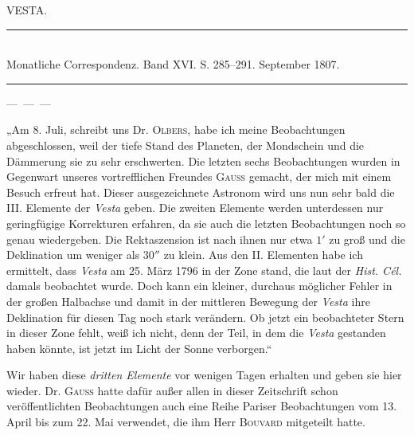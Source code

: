 \clearpage
{}
\hypertarget{native-295-lower}{}
\centerline{VESTA.}

\begin{center}
\rule{0.5\linewidth}{0.4pt}\\[2pt]
Monatliche Correspondenz. Band XVI. S. 285–291. September 1807.\\[2pt]
\rule{0.5\linewidth}{0.4pt}
\end{center}

\smallskip
\noindent---\ ---\ ---

\smallskip
\par\indent „Am 8. Juli, schreibt uns Dr. \textsc{Olbers}, habe ich meine Beobachtungen abgeschlossen, weil der tiefe Stand des Planeten, der Mondschein und die Dämmerung sie zu sehr erschwerten. Die letzten sechs Beobachtungen wurden in Gegenwart unseres vortrefflichen Freundes \textsc{Gauss} gemacht, der mich mit einem Besuch erfreut hat. Dieser ausgezeichnete Astronom wird uns nun sehr bald die III. Elemente der \emph{Vesta} geben. Die zweiten Elemente werden unterdessen nur geringfügige Korrekturen erfahren, da sie auch die letzten Beobachtungen noch so genau wiedergeben. Die Rektaszension ist nach ihnen nur etwa $1'$ zu groß und die Deklination um weniger als $30''$ zu klein. Aus den II. Elementen habe ich ermittelt, dass \emph{Vesta} am 25. März 1796 in der Zone stand, die laut der \emph{Hist. Cél.} damals beobachtet wurde. Doch kann ein kleiner, durchaus
möglicher Fehler in der großen Halbachse und damit in der mittleren Bewegung der \emph{Vesta} ihre Deklination für diesen Tag noch stark verändern. Ob jetzt ein beobachteter Stern in dieser Zone fehlt, weiß ich nicht, denn der Teil, in dem die \emph{Vesta} gestanden haben könnte, ist jetzt im Licht der Sonne verborgen.“

\par\indent Wir haben diese \emph{dritten Elemente} vor wenigen Tagen erhalten und geben sie hier wieder. Dr. \textsc{Gauss} hatte dafür außer allen in dieser Zeitschrift schon veröffentlichten Beobachtungen auch eine Reihe Pariser Beobachtungen vom 13. April bis zum 22. Mai verwendet, die ihm Herr \textsc{Bouvard} mitgeteilt hatte.

\smallskip

